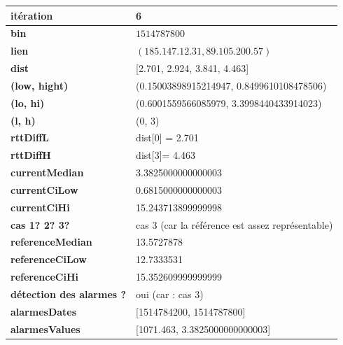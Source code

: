 \begin{table}[H]
	\centering
	
	\begin{tabularx}{\linewidth}{|l|X| }
		\hline
		\textbf{itération} & 6	\\ \hline
		\textbf{bin} & $1514787800$ \\ \hline
		\textbf{lien} & $(185.147.12.31, 89.105.200.57)$  \\ \hline
		\textbf{dist}& [2.701, 2.924, 3.841, 4.463]	\\ \hline
		\textbf{(low, hight)}& (0.15003898915214947, 0.8499610108478506) 	\\ \hline
		\textbf{(lo, hi)}&(0.6001559566085979, 3.3998440433914023)  \\ \hline
		\textbf{(l, h)} & (0, 3) 	\\ \hline
		\textbf{rttDiffL}& dist[0] = 2.701	\\ \hline
		\textbf{rttDiffH}& dist[3]= 4.463	\\ \hline
		\textbf{currentMedian}&  3.3825000000000003	\\ \hline
		\textbf{currentCiLow}& 0.6815000000000003 	\\ \hline
		\textbf{currentCiHi}& 15.243713899999998	\\ \hline
		\textbf{cas 1? 2? 3?}& cas 3 (car la référence est assez représentable)  \\ \hline
		\textbf{referenceMedian}& 13.5727878 	\\ \hline
		\textbf{referenceCiLow}&  12.7333531	\\ \hline
		\textbf{referenceCiHi}& 15.352609999999999 	\\ \hline
		\textbf{détection des alarmes ?}& oui (car : cas 3)	\\ \hline
		\textbf{alarmesDates}& [1514784200, 1514787800]	\\ \hline
		\textbf{alarmesValues}& [1071.463, 3.3825000000000003]	\\ \hline
	\end{tabularx}
\end{table}
